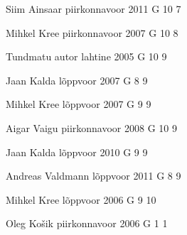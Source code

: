 \documentclass[11pt]{article}
\begin{document}
{Siim Ainsaar} %
{piirkonnavoor} %
{2011} %
{G 10} %
{7} %
{

\ifEngHint
\fi
}

{Mihkel Kree} %
{piirkonnavoor} %
{2007} %
{G 10} %
{8} %
{

\ifEngHint
\fi
}

{Tundmatu autor} %
{lahtine} %
{2005} %
{G 10} %
{9} %
{

\ifEngHint
\fi
}

{Jaan Kalda} %
{lõppvoor} %
{2007} %
{G 8} %
{9} %
{

\ifEngHint
\fi
}

{Mihkel Kree} %
{lõppvoor} %
{2007} %
{G 9} %
{9} %
{

\ifEngHint
\fi
}

{Aigar Vaigu} %
{piirkonnavoor} %
{2008} %
{G 10} %
{9} %
{

\ifEngHint
\fi
}

{Jaan Kalda} %
{lõppvoor} %
{2010} %
{G 9} %
{9} %
{

\ifEngHint
\fi
}

{Andreas Valdmann} %
{lõppvoor} %
{2011} %
{G 8} %
{9} %
{

\ifEngHint
\fi
}

{Mihkel Kree} %
{lõppvoor} %
{2006} %
{G 9} %
{10} %
{

\ifEngHint
\fi
}

{Oleg Košik} %
{piirkonnavoor} %
{2006} %
{G 1} %
{1} %
{

\ifEngHint
\fi
}
\end{document}
